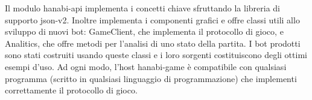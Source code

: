 \documentclass{article}
\begin{document}
\begin{flushleft}
\newline
Il modulo hanabi-api implementa i concetti chiave sfruttando la libreria di supporto json-v2. Inoltre implementa i componenti grafici e offre classi utili allo sviluppo di nuovi bot: GameClient, che implementa il protocollo di gioco, e Analitics, che offre metodi per l'analisi di uno stato della partita. I bot prodotti sono stati costruiti usando queste classi e i loro sorgenti costituiscono degli ottimi esempi d'uso.\newline
\newline
Ad ogni modo, l'host hanabi-game è compatibile con qualsiasi programma (scritto in qualsiasi linguaggio di programmazione) che implementi correttamente il protocollo di gioco. 
\end{flushleft}
\end{document}

